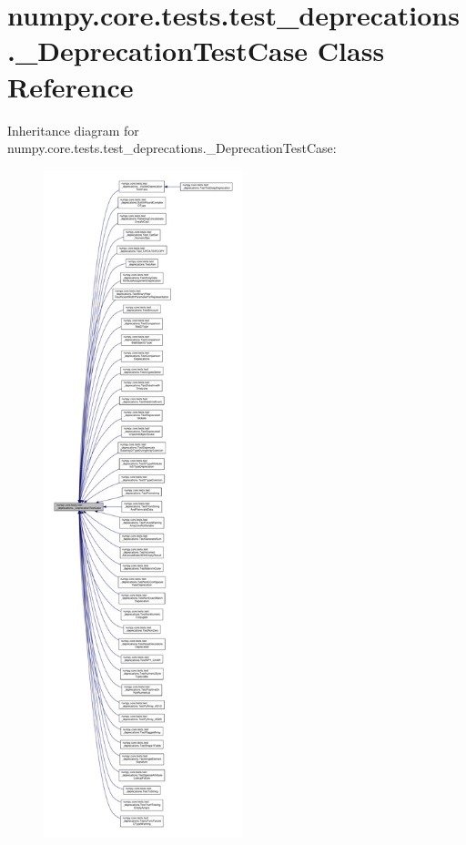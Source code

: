 \hypertarget{classnumpy_1_1core_1_1tests_1_1test__deprecations_1_1__DeprecationTestCase}{}\section{numpy.\+core.\+tests.\+test\+\_\+deprecations.\+\_\+\+Deprecation\+Test\+Case Class Reference}
\label{classnumpy_1_1core_1_1tests_1_1test__deprecations_1_1__DeprecationTestCase}


Inheritance diagram for numpy.\+core.\+tests.\+test\+\_\+deprecations.\+\_\+\+Deprecation\+Test\+Case\+:
\nopagebreak
\begin{figure}[H]
\begin{center}
\leavevmode
\includegraphics[height=550pt]{classnumpy_1_1core_1_1tests_1_1test__deprecations_1_1__DeprecationTestCase__inherit__graph}
\end{center}
\end{figure}
